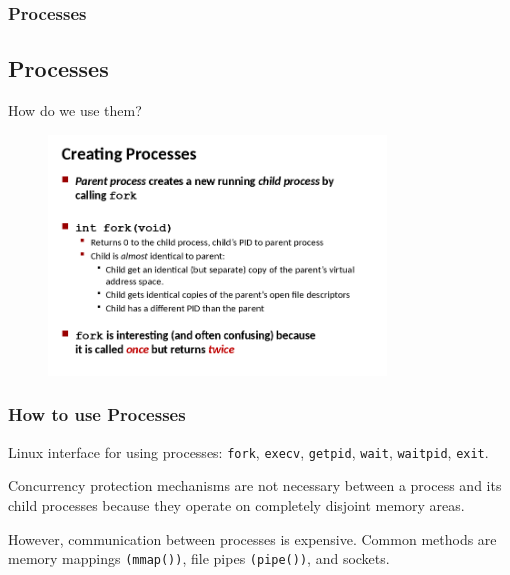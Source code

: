 \documentclass[xcolor={usenames,dvipsnames}]{beamer}
\begin{document}
%
%
%
\begin{frame}
\frametitle{Processes}
\subsection{Processes}
How do we use them?

\begin{figure}
\includegraphics[width=0.8\textwidth]{images/creating-processes.png}
\end{figure}

\end{frame}



%
%
%
\begin{frame}
\frametitle{How to use Processes}

Linux interface for using processes: \texttt{fork}, \texttt{execv}, \texttt{getpid},
\texttt{wait}, \texttt{waitpid}, \texttt{exit}.\\\vspace{3mm}

Concurrency protection mechanisms are not necessary between a process and its child
processes because they operate on completely disjoint memory areas.\\\vspace{3mm}

However, communication between processes is expensive. Common methods are memory
mappings \texttt{(mmap())}, file pipes \texttt{(pipe())}, and sockets.

\end{frame}
\end{document}
